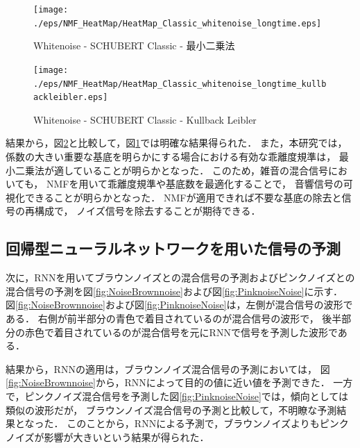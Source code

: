 \documentclass{deimj}
\begin{document}
\vspace{-10pt}
\begin{figure}[h]
  \begin{center}
\texttt{[image: ./eps/NMF\_HeatMap/HeatMap\_Classic\_whitenoise\_longtime.eps]}
    \caption{Whitenoise - SCHUBERT Classic - 最小二乗法}
    \label{fig:NMF_Frobenius}
  \end{center}
\end{figure}
%
\vspace{-20pt}
%
\begin{figure}[h]
  \begin{center}
\texttt{[image: ./eps/NMF\_HeatMap/HeatMap\_Classic\_whitenoise\_longtime\_kullbackleibler.eps]}
    \caption{Whitenoise - SCHUBERT Classic - Kullback Leibler }
    \label{fig:NMF_KL}
  \end{center}
\end{figure}
\vspace{-15pt}

結果から，図\ref{fig:NMF_KL}と比較して，図\ref{fig:NMF_Frobenius}では明確な結果得られた．
また，本研究では，係数の大きい重要な基底を明らかにする場合における有効な乖離度規準は，
最小二乗法が適していることが明らかとなった．
%
このため，雑音の混合信号においても，
NMFを用いて乖離度規準や基底数を最適化することで，
音響信号の可視化できることが明らかとなった．
NMFが適用できれば不要な基底の除去と信号の再構成で，
ノイズ信号を除去することが期待できる．

\subsection{回帰型ニューラルネットワークを用いた信号の予測}
次に，RNNを用いてブラウンノイズとの混合信号の予測およびピンクノイズとの
混合信号の予測を図\ref{fig:NoiseBrownnoise}および図\ref{fig:PinknoiseNoise}に示す．
%
図\ref{fig:NoiseBrownnoise}および図\ref{fig:PinknoiseNoise}は，左側が混合信号の波形である．
右側が前半部分の青色で着目されているのが混合信号の波形で，
後半部分の赤色で着目されているのが混合信号を元にRNNで信号を予測した波形である．

結果から，RNNの適用は，ブラウンノイズ混合信号の予測においては，
図\ref{fig:NoiseBrownnoise}から，RNNによって目的の値に近い値を予測できた．
%
一方で，ピンクノイズ混合信号を予測した図\ref{fig:PinknoiseNoise}では，傾向としては類似の波形だが，
ブラウンノイズ混合信号の予測と比較して，不明瞭な予測結果となった．
このことから，RNNによる予測で，ブラウンノイズよりもピンクノイズが影響が大きいという結果が得られた．
\end{document}
